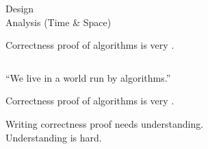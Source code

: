 
\begin{frame}{}
  
  \begin{center}
  \end{center}
\end{frame}

\begin{frame}{}
  
  \vspace{0.20cm}
  \begin{center}
  \end{center}
\end{frame}

\begin{frame}{}
  \begin{center}
    {\large 
      Design \\[20pt] \pause
      Analysis (Time \& Space) \\[20pt] \pause
    }
  \end{center}
\end{frame}

\begin{frame}{}
  \begin{center}
    Correctness proof of algorithms is very .
  \end{center}
  
  \begin{columns}
  \end{columns}
  
  \begin{center}
    ``We live in a world run by algorithms.''
  \end{center}
\end{frame}

\begin{frame}{}
  \begin{center}
    Correctness proof of algorithms is very .
  \end{center}
  
  
  \pause
  \begin{center}
    Writing correctness proof needs understanding. \\[6pt]
    Understanding is hard.
  \end{center}
\end{frame}

